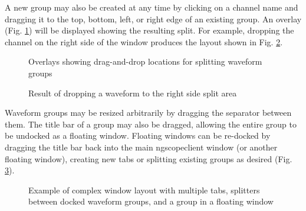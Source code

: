 A new group may also be created at any time by clicking on a channel name and dragging it to the top, bottom, left, or
right edge of an existing group. An overlay (Fig. \ref{split-overlays}) will be displayed showing the resulting split.
For example, dropping the channel on the right side of the window produces the layout shown in Fig. \ref{split-right}.

\begin{figure}[h]
\centering
{}
\caption{Overlays showing drag-and-drop locations for splitting waveform groups}
\label{split-overlays}
\end{figure}

\begin{figure}[h]
\centering
{}
\caption{Result of dropping a waveform to the right side split area}
\label{split-right}
\end{figure}

Waveform groups may be resized arbitrarily by dragging the separator between them. The title bar of a group may also be
dragged, allowing the entire group to be undocked as a floating window. Floating windows can be re-docked by dragging
the title bar back into the main ngscopeclient window (or another floating window), creating new tabs or splitting
existing groups as desired (Fig. \ref{complex-ui}).

\begin{figure}[h]
\centering
{}
\caption{Example of complex window layout with multiple tabs, splitters between docked waveform groups, and a group in
a floating window}
\label{complex-ui}
\end{figure}
